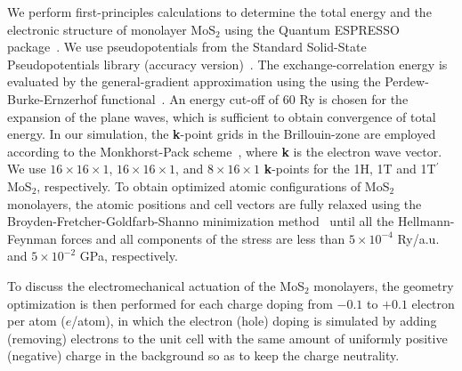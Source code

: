 \documentclass[12pt]{iopart}
\begin{document}
We perform first-principles calculations to determine the total energy
and the electronic structure of monolayer MoS$_2$ using the Quantum
ESPRESSO package~\cite{giannozzi2009quantum-short}.  We use
pseudopotentials from the Standard Solid-State Pseudopotentials
library (accuracy version)~\cite{lejaeghere2016reproducibility-short}.
The exchange-correlation energy is evaluated by the general-gradient
approximation using the using the Perdew-Burke-Ernzerhof
functional~\cite{perdew1996generalized}.  An energy cut-off of 60 Ry
is chosen for the expansion of the plane waves, which is sufficient to
obtain convergence of total energy.  In our simulation, the
\textbf{k}-point grids in the Brillouin-zone are employed according to
the Monkhorst-Pack scheme~\cite{monkhorst1976special}, where
\textbf{k} is the electron wave vector.  We use $16\times16\times1$,
$16\times16\times1$, and $8\times16\times1$ \textbf{k}-points for the
1H, 1T and 1T$^\prime$ MoS$_2$, respectively.  To obtain optimized
atomic configurations of MoS$_2$ monolayers, the atomic positions and
cell vectors are fully relaxed using the
Broyden-Fretcher-Goldfarb-Shanno minimization
method~\cite{broyden1970convergence,fletcher1970new,goldfarb1970family,shanno1970conditioning}
until all the Hellmann-Feynman forces and all components of the stress
are less than $5\times10^{-4}$ Ry/a.u. and $5\times10^{-2}$ GPa,
respectively.

To discuss the electromechanical
actuation of the MoS$_2$ monolayers, the geometry optimization is then
performed for each charge doping from $-0.1$ to $+0.1$ electron per
atom ($e$/atom), in which the electron (hole) doping is simulated by adding
(removing) electrons to the unit cell with the same amount of
uniformly positive (negative) charge in the background so as to keep
the charge neutrality.
\end{document}
